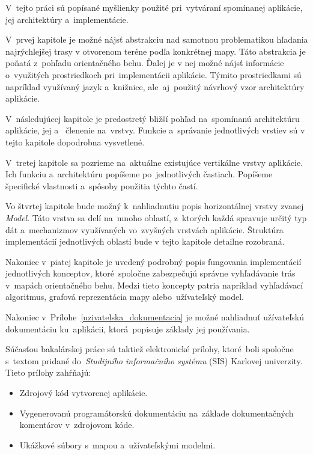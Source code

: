 \bigskip

V~tejto práci sú popísané myšlienky použité pri~vytváraní spomínanej aplikácie, jej architektúry a~implementácie. 

V~prvej kapitole je možné nájsť abstrakciu nad samotnou problematikou hľadania najrýchlejšej trasy v otvorenom teréne podľa konkrétnej mapy. Táto abstrakcia je poňatá z~pohľadu orientačného behu. Ďalej je v nej možné nájsť informácie o~využitých prostriedkoch pri~implementácii aplikácie. Týmito prostriedkami sú napríklad využívaný jazyk a~knižnice, ale~aj~použitý návrhový vzor architektúry aplikácie. 

V~následujúcej kapitole je predostretý bližší pohľad na~spomínanú architektúru aplikácie, jej  a~ členenie na~vrstvy. Funkcie a~správanie jednotlivých vrstiev sú v tejto kapitole dopodrobna vysvetlené.

V~tretej kapitole sa pozrieme na~aktuálne existujúce vertikálne vrstvy aplikácie. Ich funkciu a~architektúru popíšeme po~jednotlivých častiach. Popíšeme špecifické vlastnosti a~spôsoby použitia týchto častí. 

Vo štvrtej kapitole bude možný k~nahliadnutiu popis horizontálnej vrstvy zvanej \textit{Model}. Táto vrstva sa delí na~mnoho oblastí, z~ktorých každá spravuje určitý typ dát a~mechanizmov využívaných vo~zvyšných vrstvách aplikácie. Štruktúra implementácií jednotlivých oblastí bude v tejto kapitole detailne rozobraná.

Nakoniec v~piatej kapitole je uvedený podrobný popis fungovania implementácií jednotlivých konceptov, ktoré~spoločne zabezpečujú správne vyhľadávanie trás v~mapách orientačného behu. Medzi tieto koncepty patria napríklad vyhľadávací algoritmus, grafová reprezentácia mapy alebo~užívateľský model.

Nakoniec v~Prílohe~\ref{uzivatelska_dokumentacia} je možné nahliadnuť užívateľskú dokumentáciu ku~aplikácii, ktorá~popisuje základy jej používania.

Súčasťou bakalárskej práce sú taktiež elektronické prílohy, ktoré~boli spoločne s~textom pridané do~\textit{Studijního informačního systému} (SIS) Karlovej univerzity. Tieto prílohy zahŕňajú:
\begin{itemize}
    \item Zdrojový kód vytvorenej aplikácie.
    \item Vygenerovanú programátorskú dokumentáciu na~základe dokumentačných komentárov v~zdrojovom kóde.
    \item Ukážkové súbory s~mapou a~užívateľskými modelmi.  
\end{itemize}